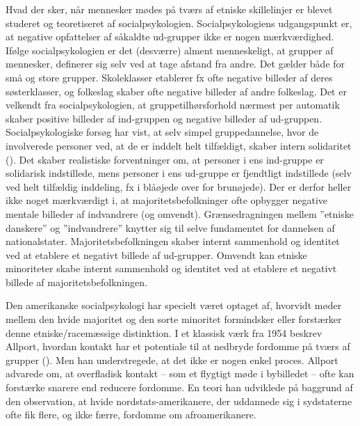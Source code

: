 \documentclass[
]{book}
\begin{document}
Hvad der sker, når mennesker mødes på tværs af etniske skillelinjer er blevet studeret og teoretiseret af socialpsykologien. Socialpsykologiens udgangspunkt er, at negative opfattelser af såkaldte ud-grupper ikke er nogen mærkværdighed. Ifølge socialpsykologien er det (desværre) alment menneskeligt, at grupper af mennesker, definerer sig selv ved at tage afstand fra andre. Det gælder både for små og store grupper. Skoleklasser etablerer fx ofte negative billeder af deres søsterklasser, og folkeslag skaber ofte negative billeder af andre folkeslag. Det er velkendt fra socialpsykologien, at gruppetilhørsforhold nærmest per automatik skaber positive billeder af ind-gruppen og negative billeder af ud-gruppen. Socialpsykologiske forsøg har vist, at selv simpel gruppedannelse, hvor de involverede personer ved, at de er inddelt helt tilfældigt, skaber intern solidaritet (). Det skaber realistiske forventninger om, at personer i ens ind-gruppe er solidarisk indstillede, mens personer i ens ud-gruppe er fjendtligt indstillede (selv ved helt tilfældig inddeling, fx i blåøjede over for brunøjede). Der er derfor heller ikke noget mærkværdigt i, at majoritetsbefolkninger ofte opbygger negative mentale billeder af indvandrere (og omvendt). Grænsedragningen mellem ''etniske danskere'' og ''indvandrere'' knytter sig til selve fundamentet for dannelsen af nationalstater. Majoritetsbefolkningen skaber internt sammenhold og identitet ved at etablere et negativt billede af ud-grupper. Omvendt kan etniske minoriteter skabe internt sammenhold og identitet ved at etablere et negativt billede af majoritetsbefolkningen.

Den amerikanske socialpsykologi har specielt været optaget af, hvorvidt møder mellem den hvide majoritet og den sorte minoritet formindsker eller forstærker denne etniske/racemæssige distinktion. I et klassisk værk fra 1954 beskrev Allport, hvordan kontakt har et potentiale til at nedbryde fordomme på tværs af grupper (). Men han understregede, at det ikke er nogen enkel proces. Allport advarede om, at overfladisk kontakt -- som et flygtigt møde i bybilledet -- ofte kan forstærke snarere end reducere fordomme. En teori han udviklede på baggrund af den observation, at hvide nordstats-amerikanere, der uddannede sig i sydstaterne ofte fik flere, og ikke færre, fordomme om afroamerikanere.
\end{document}
